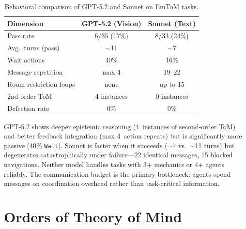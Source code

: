 \documentclass{article} %
\begin{document}
\begin{table}[h]
\centering
\small
\begin{tabular}{lcc}
\toprule
\textbf{Dimension} & \textbf{GPT-5.2 (Vision)} & \textbf{Sonnet (Text)} \\
\midrule
Pass rate & 6/35 (17\%) & 8/33 (24\%) \\
Avg.\ turns (pass) & $\sim$11 & $\sim$7 \\
Wait actions & 40\% & 16\% \\
Message repetition & max 4 & 19--22 \\
Room restriction loops & none & up to 15 \\
2nd-order ToM & 4 instances & 0 instances \\
Defection rate & 0\% & 0\% \\
\bottomrule
\end{tabular}
\caption{Behavioral comparison of GPT-5.2 and Sonnet on EmToM tasks.}
\label{tab:model_comparison}
\end{table}

GPT-5.2 shows deeper epistemic reasoning (4~instances of second-order ToM) and better feedback integration (max 4~action repeats) but is significantly more passive (40\% \texttt{Wait}). Sonnet is faster when it succeeds ($\sim$7 vs.\ $\sim$11 turns) but degenerates catastrophically under failure---22 identical messages, 15 blocked navigations. Neither model handles tasks with 3+ mechanics or 4+ agents reliably. The communication budget is the primary bottleneck: agents spend messages on coordination overhead rather than task-critical information.




\newpage
\appendix
\section{Orders of Theory of Mind}
\label{app:tom_orders}
\end{document}
